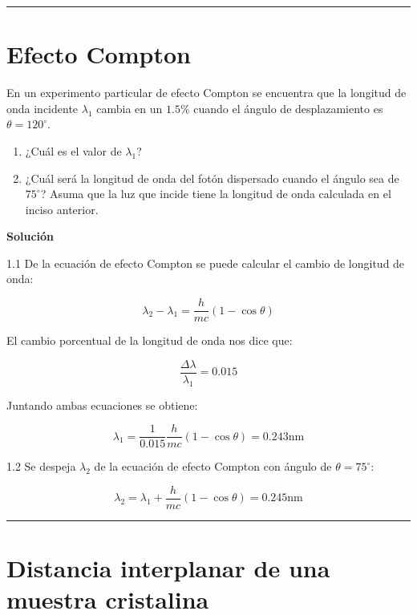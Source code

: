 \documentclass[12pt]{article}
\begin{document}
\noindent\rule{16.5cm}{0.4pt}


\section{Efecto Compton}

	En un experimento particular de efecto Compton se encuentra que la
	longitud de onda incidente $\lambda_1$ cambia en un $1.5\%$ cuando el ángulo de
	desplazamiento es $\theta = 120^{\circ}$.
	
	\begin{enumerate}
		\item  ¿Cuál es el valor de $\lambda_1$?
		\item  ¿Cuál será la longitud
		de onda del fotón dispersado cuando el ángulo sea de $75^{\circ}$? Asuma que la luz que incide tiene la longitud de onda calculada en el inciso anterior.
	\end{enumerate}

\begin{center}
	\textbf{Solución}
\end{center}

1.1 De la ecuación de efecto Compton se puede calcular el cambio de longitud de onda:

\begin{equation*}
\lambda_2-\lambda_1 =  \frac{h}{mc}(1-\cos\theta)
\end{equation*}

El cambio porcentual de la longitud de onda nos dice que:

\begin{equation*}
\frac{\Delta \lambda}{\lambda_1} = 0.015 
\end{equation*}

Juntando ambas ecuaciones se obtiene:

\begin{equation*}
 \lambda_1 = \frac{1}{0.015}\frac{h}{mc}(1-\cos\theta) = 0.243 \text{nm}
\end{equation*}

1.2 Se despeja $\lambda_2$ de la ecuación de efecto Compton con ángulo de  $\theta = 75^{\circ}$:


\begin{equation*}
\lambda_2 = \lambda_1+ \frac{h}{mc}(1-\cos\theta) = 0.245 \text{nm}
\end{equation*}

\noindent\rule{16.5cm}{0.4pt}


\section{Distancia interplanar de una muestra cristalina}
\end{document}
